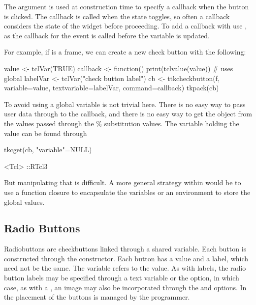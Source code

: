 The  argument is used at construction
time to specify a callback when the button is clicked. The callback is
called when the state toggles, so often a callback considers the state
of the widget before proceeding.  To add a callback with
 use , as the callback
for the event  is called before the variable is
updated.

For example, if  is a frame, we can create a new check button
with the following:

\begin{Schunk}
\begin{Sinput}
 value <- tclVar(TRUE)
 callback <- function() print(tclvalue(value))     # uses global
 labelVar <- tclVar("check button label")
 cb <- ttkcheckbutton(f, variable=value, 
                      textvariable=labelVar, command=callback)
 tkpack(cb)
\end{Sinput}
\end{Schunk}

To avoid using a global variable is not trivial here. There is no easy way to pass user data through to the callback, and there is no easy way to get the \R\/ object from the values passed through the \% substitution values. The variable holding the value can be found through
\begin{Schunk}
\begin{Sinput}
 tkcget(cb, "variable"=NULL)
\end{Sinput}
\begin{Soutput}
<Tcl> ::RTcl3 
\end{Soutput}
\end{Schunk}

But manipulating that is difficult.  A more general strategy within
\R\/ would be to use a function closure to encapsulate the variables
or an environment to store the global values.



\subsection{Radio Buttons}
\label{sec:tcltk:radio-buttons}

Radiobuttons are checkbuttons linked through a shared \TCL\/ variable. Each button is constructed
through the  constructor. Each button has a value and a
label, which need not be the same. The variable refers to the
value. As with labels, the radio button labels may be specified
through a text variable or the  option,
in which case, as with a , an image may also be incorporated through the
 and  options. In \TK\/ the placement of the buttons is managed by the programmer.


